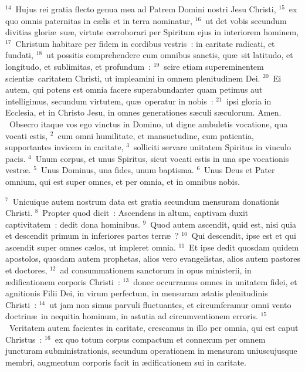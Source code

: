 ${}^{14}$~Hujus rei gratia flecto genua mea ad Patrem Domini nostri Jesu Christi,
${}^{15}$~ex quo omnis paternitas in c\ae lis et in terra nominatur,
${}^{16}$~ut det vobis secundum divitias glori\ae\ su\ae , virtute corroborari per Spiritum ejus in interiorem hominem,
${}^{17}$~Christum habitare per fidem in cordibus vestris~: in caritate radicati, et fundati,
${}^{18}$~ut possitis comprehendere cum omnibus sanctis, qu\ae\ sit latitudo, et longitudo, et sublimitas, et profundum~:
${}^{19}$~scire etiam supereminentem scienti\ae\ caritatem Christi, ut impleamini in omnem plenitudinem Dei.
${}^{20}$~Ei autem, qui potens est omnia facere superabundanter quam petimus aut intelligimus, secundum virtutem, qu\ae\ operatur in nobis~:
${}^{21}$~ipsi gloria in Ecclesia, et in Christo Jesu, in omnes generationes s\ae culi s\ae culorum. Amen.
~Obsecro itaque vos ego vinctus in Domino, ut digne ambuletis vocatione, qua vocati estis,
${}^{2}$~cum omni humilitate, et mansuetudine, cum patientia, supportantes invicem in caritate,
${}^{3}$~solliciti servare unitatem Spiritus in vinculo pacis.
${}^{4}$~Unum corpus, et unus Spiritus, sicut vocati estis in una spe vocationis vestr\ae .
${}^{5}$~Unus Dominus, una fides, unum baptisma.
${}^{6}$~Unus Deus et Pater omnium, qui est super omnes, et per omnia, et in omnibus nobis.


${}^{7}$~Unicuique autem nostrum data est gratia secundum mensuram donationis Christi.
${}^{8}$~Propter quod dicit~: Ascendens in altum, captivam duxit captivitatem~: dedit dona hominibus.
${}^{9}$~Quod autem ascendit, quid est, nisi quia et descendit primum in inferiores partes terr\ae~?
${}^{10}$~Qui descendit, ipse est et qui ascendit super omnes c\ae los, ut impleret omnia.
${}^{11}$~Et ipse dedit quosdam quidem apostolos, quosdam autem prophetas, alios vero evangelistas, alios autem pastores et doctores,
${}^{12}$~ad consummationem sanctorum in opus ministerii, in \ae dificationem corporis Christi~:
${}^{13}$~donec occurramus omnes in unitatem fidei, et agnitionis Filii Dei, in virum perfectum, in mensuram \ae tatis plenitudinis Christi~:
${}^{14}$~ut jam non simus parvuli fluctuantes, et circumferamur omni vento doctrin\ae\ in nequitia hominum, in astutia ad circumventionem erroris.
${}^{15}$~Veritatem autem facientes in caritate, crescamus in illo per omnia, qui est caput Christus~:
${}^{16}$~ex quo totum corpus compactum et connexum per omnem juncturam subministrationis, secundum operationem in mensuram uniuscujusque membri, augmentum corporis facit in \ae dificationem sui in caritate.


